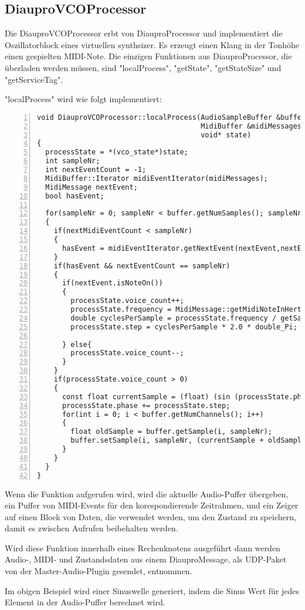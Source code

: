 \subsection{DiauproVCOProcessor}

Die DiauproVCOProcessor erbt von DiauproProcessor und implementiert die Oszillatorblock eines virtuellen synthsizer. Es erzeugt einen Klang in der Tonhöhe einen gespielten MIDI-Note. Die einzigen Funktionen aus DiauproProcessor, die überladen werden müssen, sind "localProcess", "getState", "getStateSize" und "getServiceTag".

"localProcess" wird wie folgt implementiert:
\begin{lstlisting}[numbers=left]
void DiauproVCOProcessor::localProcess(AudioSampleBuffer &buffer,
                                       MidiBuffer &midiMessages,
                                       void* state)
{
  processState = *(vco_state*)state;
  int sampleNr;
  int nextEventCount = -1;
  MidiBuffer::Iterator midiEventIterator(midiMessages);
  MidiMessage nextEvent;
  bool hasEvent;

  for(sampleNr = 0; sampleNr < buffer.getNumSamples(); sampleNr++)
  {
    if(nextMidiEventCount < sampleNr)
    {
      hasEvent = midiEventIterator.getNextEvent(nextEvent,nextEventCount )
    }
    if(hasEvent && nextEventCount == sampleNr)
    {
      if(nextEvent.isNoteOn())
      {
        processState.voice_count++;
        processState.frequency = MidiMessage::getMidiNoteInHertz(nextEvent.getNoteNumber());
        double cyclesPerSample = processState.frequency / getSampleRate();
        processState.step = cyclesPerSample * 2.0 * double_Pi;

      } else{
        processState.voice_count--;
      }
    }
    if(processState.voice_count > 0)
    {
      const float currentSample = (float) (sin (processState.phase) * processState.level);
      processState.phase += processState.step;
      for(int i = 0; i < buffer.getNumChannels(); i++)
      {
        float oldSample = buffer.getSample(i, sampleNr);
        buffer.setSample(i, sampleNr, (currentSample + oldSample)*0.5);
      }
    }
  }
}
\end{lstlisting}

\noindent
Wenn die Funktion aufgerufen wird, wird die aktuelle Audio-Puffer übergeben, ein Puffer von MIDI-Events für den korespondierende Zeitrahmen, und ein Zeiger auf einen Block von Daten, die verwendet werden, um den Zustand zu speichern, damit es zwischen Aufrufen beibehalten werden.

Wird diese Funktion innerhalb eines Rechenknotens ausgeführt dann werden Audio-, MIDI- und Zustandsdaten aus einem DiauproMessage, als UDP-Paket von der Master-Audio-Plugin gesendet, entnommen.

Im obigen Beispiel wird einer Sinuswelle generiert, indem die Sinus Wert für jedes Element in der Audio-Puffer berechnet wird.